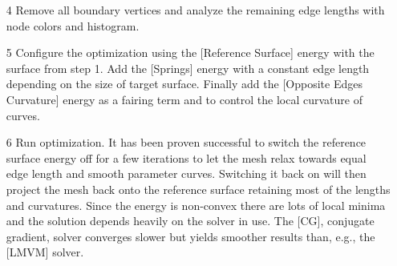 \documentclass[Thesis.tex]{subfiles}
\begin{document}
\begin{itemize}
\item[4] Remove all boundary vertices and analyze the remaining edge lengths with node colors and histogram.

\begin{center}
\begin{minipage}{0.9\linewidth}
            \centering
\end{minipage}
\end{center}   

\item[5] Configure the optimization using the [Reference Surface] energy with the surface from step 1. Add the [Springs] energy with a constant edge length depending on the size of target surface. Finally add the [Opposite Edges Curvature] energy as a fairing term and to control the local curvature of curves.

\begin{center}
\begin{minipage}{0.9\linewidth}
            \centering
\end{minipage}
\end{center}   

\item[6] Run optimization. It has been proven successful to switch the reference surface energy off for a few iterations to let the mesh relax towards equal edge length and smooth parameter curves. Switching it back on will then project the mesh back onto the reference surface retaining most of the lengths and curvatures. Since the energy is non-convex there are lots of local minima and the solution depends heavily on the solver in use. The [CG], conjugate gradient, solver converges slower but yields smoother results than, e.g., the [LMVM] solver.

\end{itemize}

\subfilebibliography
\end{document}
